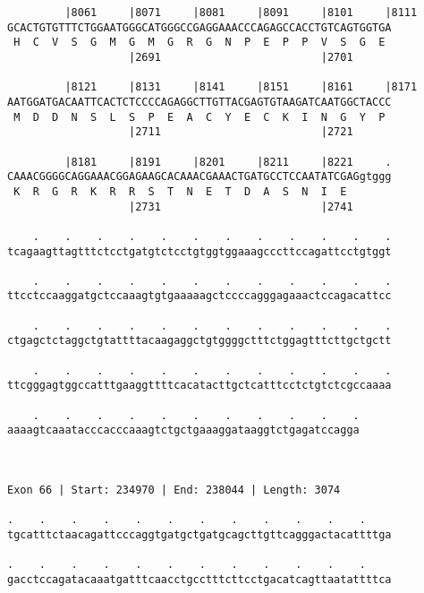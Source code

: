 \documentclass{article}
\begin{document}
\begin{Verbatim}
         |8061     |8071     |8081     |8091     |8101     |8111
GCACTGTGTTTCTGGAATGGGCATGGGCCGAGGAAACCCAGAGCCACCTGTCAGTGGTGA
 H  C  V  S  G  M  G  M  G  R  G  N  P  E  P  P  V  S  G  E 
                   |2691                         |2701      
  
         |8121     |8131     |8141     |8151     |8161     |8171
AATGGATGACAATTCACTCTCCCCAGAGGCTTGTTACGAGTGTAAGATCAATGGCTACCC
 M  D  D  N  S  L  S  P  E  A  C  Y  E  C  K  I  N  G  Y  P 
                   |2711                         |2721      
  
         |8181     |8191     |8201     |8211     |8221     .
CAAACGGGGCAGGAAACGGAGAAGCACAAACGAAACTGATGCCTCCAATATCGAGgtggg
 K  R  G  R  K  R  R  S  T  N  E  T  D  A  S  N  I  E       
                   |2731                         |2741      
  
    .    .    .    .    .    .    .    .    .    .    .    .
tcagaagttagtttctcctgatgtctcctgtggtggaaagcccttccagattcctgtggt
                                                            
    .    .    .    .    .    .    .    .    .    .    .    .
ttcctccaaggatgctccaaagtgtgaaaaagctccccagggagaaactccagacattcc
                                                            
    .    .    .    .    .    .    .    .    .    .    .    .
ctgagctctaggctgtattttacaagaggctgtggggctttctggagtttcttgctgctt
                                                            
    .    .    .    .    .    .    .    .    .    .    .    .
ttcgggagtggccatttgaaggttttcacatacttgctcatttcctctgtctcgccaaaa
                                                            
    .    .    .    .    .    .    .    .    .    .    .
aaaagtcaaatacccacccaaagtctgctgaaaggataaggtctgagatccagga
                                                       
                                                       
 
Exon 66 | Start: 234970 | End: 238044 | Length: 3074
 
.    .    .    .    .    .    .    .    .    .    .    .    
tgcatttctaacagattcccaggtgatgctgatgcagcttgttcagggactacattttga
                                                            
.    .    .    .    .    .    .    .    .    .    .    .    
gacctccagatacaaatgatttcaacctgcctttcttcctgacatcagttaatattttca
                                                            

\end{Verbatim}
\end{document}
